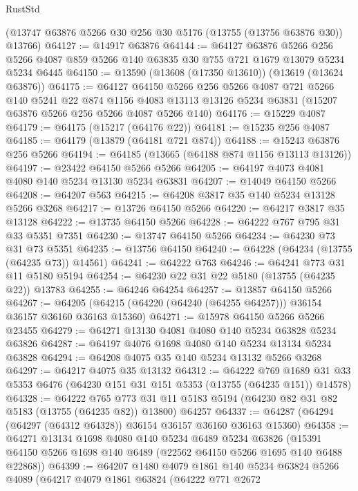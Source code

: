 \begin{lexlean}{RustStd}
\begin{coremodule}
    (@13747 @63876 @5266 @30 @256 @30 @5176 (@13755 (@13756 @63876 @30)) @13766)
@64127 := @14917 @63876
@64144 := @64127
    @63876
    @5266
    @256
    @5266
    @4087
    @859
    @5266
    @140
    @63835
    @30
    @755
    @721
    @1679
    @13079
    @5234
    @5234
    @6445
@64150 := @13590 (@13608 (@17350 @13610)) (@13619 (@13624 @63876))
@64175 := @64127
    @64150
    @5266
    @256
    @5266
    @4087
    @721
    @5266
    @140
    @5241
    @22
    @874
    @1156
    @4083
    @13113
    @13126
    @5234
    @63831
    (@15207 @63876 @5266 @256 @5266 @4087 @5266 @140)
@64176 := @15229 @4087
@64179 := @64175 (@15217 (@64176 @22))
@64181 := @15235 @256 @4087
@64185 := @64179 (@13879 (@64181 @721 @874))
@64188 := @15243 @63876 @256 @5266
@64194 := @64185 (@13665 (@64188 @874 @1156 @13113 @13126))
@64197 := @23422 @64150 @5266 @5266
@64205 := @64197 @4073 @4081 @4080 @140 @5234 @13130 @5234 @63831
@64207 := @14049 @64150 @5266
@64208 := @64207 @563
@64215 := @64208 @3817 @35 @140 @5234 @13128 @5266 @3268
@64217 := @13726 @64150 @5266
@64220 := @64217 @3817 @35 @13128
@64222 := @13735 @64150 @5266
@64228 := @64222 @767 @795 @31 @33 @5351 @7351
@64230 := @13747 @64150 @5266
@64234 := @64230 @73 @31 @73 @5351
@64235 := @13756 @64150
@64240 := @64228 (@64234 (@13755 (@64235 @73)) @14561)
@64241 := @64222 @763
@64246 := @64241 @773 @31 @11 @5180 @5194
@64254 := @64230 @22 @31 @22 @5180 (@13755 (@64235 @22)) @13783
@64255 := @64246 @64254
@64257 := @13857 @64150 @5266
@64267 := @64205 (@64215 (@64220 (@64240 (@64255 @64257))) @36154 @36157 @36160 @36163 @15360)
@64271 := @15978 @64150 @5266 @5266 @23455
@64279 := @64271 @13130 @4081 @4080 @140 @5234 @63828 @5234 @63826
@64287 := @64197 @4076 @1698 @4080 @140 @5234 @13134 @5234 @63828
@64294 := @64208 @4075 @35 @140 @5234 @13132 @5266 @3268
@64297 := @64217 @4075 @35 @13132
@64312 := @64222
    @769
    @1689
    @31
    @33
    @5353
    @6476
    (@64230 @151 @31 @151 @5353 (@13755 (@64235 @151)) @14578)
@64328 := @64222
    @765
    @773
    @31
    @11
    @5183
    @5194
    (@64230 @82 @31 @82 @5183 (@13755 (@64235 @82)) @13800)
    @64257
@64337 := @64287 (@64294 (@64297 (@64312 @64328)) @36154 @36157 @36160 @36163 @15360)
@64358 := @64271
    @13134
    @1698
    @4080
    @140
    @5234
    @6489
    @5234
    @63826
    (@15391 @64150 @5266 @1698 @140 @6489 (@22562 @64150 @5266 @1695 @140 @6488 @22868))
@64399 := @64207
    @1480
    @4079
    @1861
    @140
    @5234
    @63824
    @5266
    @4089
    (@64217
      @4079
      @1861
      @63824
      (@64222
        @771
        @2672

\end{coremodule}
\end{lexlean}
